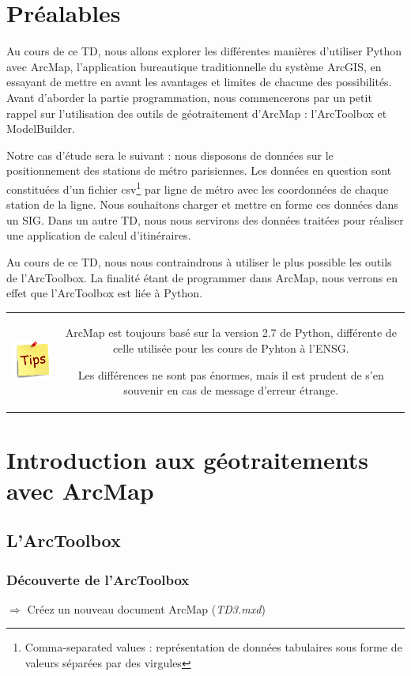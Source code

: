 \documentclass[11pt]{article}
\newcommand{\action}{$\Rightarrow$ }
\newenvironment{note}{%
	\begin{tabular}[t t]{c c}
		\includegraphics{img/tips.png}
		 &
		\begin{minipage}[c]{0.9\linewidth}
			\begin{sffamily}
}{%
			\end{sffamily}
		\end{minipage}
	\end{tabular}
}
\begin{document}
\section*{Préalables}
Au cours de ce TD, nous allons explorer les différentes manières d'utiliser Python avec ArcMap, l'application bureautique traditionnelle du système ArcGIS, en essayant de mettre en avant les avantages et limites de chacune des possibilités. Avant d'aborder la partie programmation, nous commencerons par un petit rappel sur l'utilisation des outils de géotraitement d'ArcMap : l'ArcToolbox et ModelBuilder.


Notre cas d'étude sera le suivant : nous disposons de données sur le positionnement des stations de métro parisiennes. Les données en question sont constituées d'un fichier csv\footnote{Comma-separated values : représentation de données tabulaires sous forme de valeurs séparées par des virgules} par ligne de métro avec les coordonnées de chaque station de la ligne. Nous souhaitons charger et mettre en forme ces données dans un SIG. Dans un autre TD, nous nous servirons des données traitées pour réaliser une application de calcul d'itinéraires.

Au cours de ce TD, nous nous contraindrons à utiliser le plus possible les outils de l'ArcToolbox. La finalité étant de programmer dans ArcMap, nous verrons en effet que l'ArcToolbox est liée à Python.

\begin{note}
ArcMap est toujours basé sur la version 2.7 de Python, différente de celle utilisée pour les cours de Pyhton à l'ENSG.

Les différences ne sont pas énormes, mais il est prudent de s'en souvenir en cas de message d'erreur étrange.
\end{note}



\section{Introduction aux géotraitements avec ArcMap}

\subsection{L'ArcToolbox}
\subsubsection{Découverte de l'ArcToolbox}
\action Créez un nouveau document ArcMap (\textit{TD3.mxd})
\end{document}
